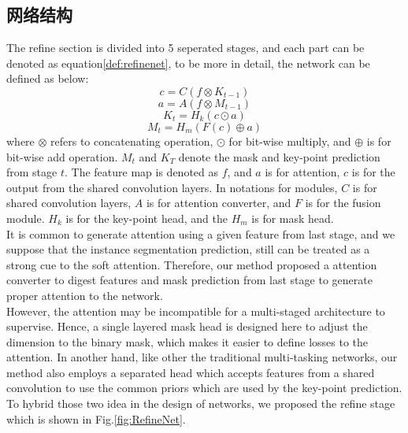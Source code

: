 \subsection{网络结构}
\label{subsec:architecture}
The refine section is divided into 5 seperated stages, and each part can be denoted as equation\eqref{def:refinenet}, to be more in detail, the network can be defined as below:
\begin{equation}
c = C({f}\otimes{K_{t-1}})
\end{equation}
\begin{equation}
a = A(f\otimes{M_{t-1}})
\end{equation}
\begin{equation}
K_t = H_k(c\odot a)
\end{equation}
\begin{equation}
M_t = H_m(F(c) \oplus a)
\end{equation}
where $\otimes$ refers to concatenating operation, $\odot$ for bit-wise multiply, and $\oplus$ is for bit-wise add operation. $M_t$ and $K_T$ denote the mask and key-point prediction from stage $t$. The feature map is denoted as $f$, and $a$ is for attention, $c$ is for the output from the shared convolution layers. In notations for modules, $C$ is for shared convolution layers, $A$ is for attention converter, and $F$ is for the fusion module. $H_k$ is for the key-point head, and the $H_m$ is for mask head.\\
It is common to generate attention using a given feature from last stage, and we suppose that the instance segmentation prediction, still can be treated as a strong cue to the soft attention. Therefore, our method proposed a attention converter to digest features and mask prediction from last stage to generate proper attention to the network.\\
However, the attention may be incompatible for a multi-staged architecture to supervise. Hence, a single layered mask head is designed here to adjust the dimension to the binary mask, which makes it easier to define losses to the attention. In another hand, like other the traditional multi-tasking networks, our method also employs a separated head which accepts features from a shared convolution to use the common priors which are used by the key-point prediction. To hybrid those two idea in the design of networks, we proposed the refine stage which is shown in Fig.\ref{fig:RefineNet}.\\

